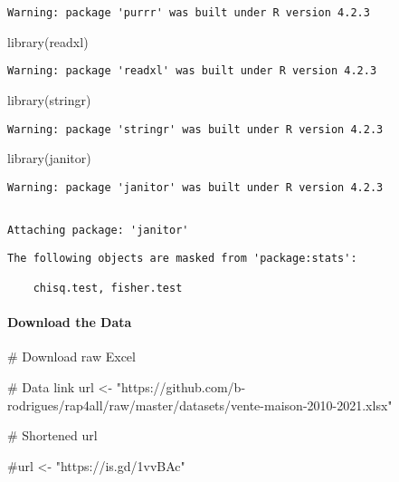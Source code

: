 \documentclass[
  letterpaper,
  DIV=11,
  numbers=noendperiod]{scrartcl}
\let\oldparagraph\paragraph
\renewcommand{\paragraph}[1]{\oldparagraph{#1}\mbox{}}
\newenvironment{Shaded}{\begin{snugshade}}{\end{snugshade}}
\newcommand{\CommentTok}[1]{\textcolor[rgb]{0.37,0.37,0.37}{#1}}
\newcommand{\FunctionTok}[1]{\textcolor[rgb]{0.28,0.35,0.67}{#1}}
\newcommand{\NormalTok}[1]{\textcolor[rgb]{0.00,0.23,0.31}{#1}}
\newcommand{\OtherTok}[1]{\textcolor[rgb]{0.00,0.23,0.31}{#1}}
\newcommand{\StringTok}[1]{\textcolor[rgb]{0.13,0.47,0.30}{#1}}
\begin{document}
\begin{verbatim}
Warning: package 'purrr' was built under R version 4.2.3
\end{verbatim}

\begin{Shaded}
\begin{Highlighting}[]
\FunctionTok{library}\NormalTok{(readxl)}
\end{Highlighting}
\end{Shaded}

\begin{verbatim}
Warning: package 'readxl' was built under R version 4.2.3
\end{verbatim}

\begin{Shaded}
\begin{Highlighting}[]
\FunctionTok{library}\NormalTok{(stringr)}
\end{Highlighting}
\end{Shaded}

\begin{verbatim}
Warning: package 'stringr' was built under R version 4.2.3
\end{verbatim}

\begin{Shaded}
\begin{Highlighting}[]
\FunctionTok{library}\NormalTok{(janitor)}
\end{Highlighting}
\end{Shaded}

\begin{verbatim}
Warning: package 'janitor' was built under R version 4.2.3
\end{verbatim}

\begin{verbatim}

Attaching package: 'janitor'
\end{verbatim}

\begin{verbatim}
The following objects are masked from 'package:stats':

    chisq.test, fisher.test
\end{verbatim}

\hypertarget{download-the-data}{%
\paragraph{Download the Data}\label{download-the-data}}

\begin{Shaded}
\begin{Highlighting}[]
\CommentTok{\# Download raw Excel}


\CommentTok{\# Data link}
\NormalTok{url }\OtherTok{\textless{}{-}} \StringTok{"https://github.com/b{-}rodrigues/rap4all/raw/master/datasets/vente{-}maison{-}2010{-}2021.xlsx"}



\CommentTok{\# Shortened url}

\CommentTok{\#url \textless{}{-} "https://is.gd/1vvBAc"}
\end{Highlighting}
\end{Shaded}
\end{document}
